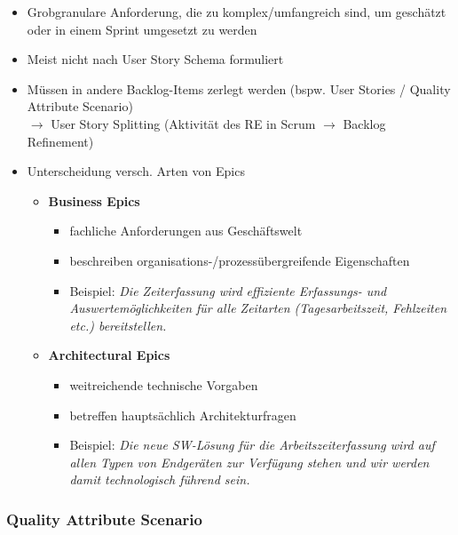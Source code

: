 \documentclass[a4paper]{article}
\begin{document}
			\begin{itemize}
				\item Grobgranulare Anforderung, die zu komplex/umfangreich sind, um geschätzt oder in einem Sprint umgesetzt zu werden
				\item Meist nicht nach User Story Schema formuliert
				\item Müssen in andere Backlog-Items zerlegt werden (bspw. User Stories / Quality Attribute Scenario)\\
					$\rightarrow$ User Story Splitting (Aktivität des RE in Scrum $\rightarrow$ Backlog Refinement)
				\item Unterscheidung versch. Arten von Epics
					\begin{itemize}
						\item \textbf{Business Epics}
							\begin{itemize}
								\item fachliche Anforderungen aus Geschäftswelt
								\item beschreiben organisations-/prozessübergreifende Eigenschaften
								\item Beispiel: \textit{Die Zeiterfassung wird effiziente Erfassungs- und Auswertemöglichkeiten für alle Zeitarten (Tagesarbeitszeit, Fehlzeiten etc.) bereitstellen.}
							\end{itemize}
						\item \textbf{Architectural Epics}
							\begin{itemize}
								\item weitreichende technische Vorgaben
								\item betreffen hauptsächlich Architekturfragen
								\item Beispiel: \textit{Die neue SW-Lösung für die Arbeitszeiterfassung wird auf allen Typen von Endgeräten zur Verfügung stehen und wir werden damit technologisch führend sein.}
							\end{itemize}
					\end{itemize}
			\end{itemize}
		
			\subsubsection{Quality Attribute Scenario}
			
\end{document}
